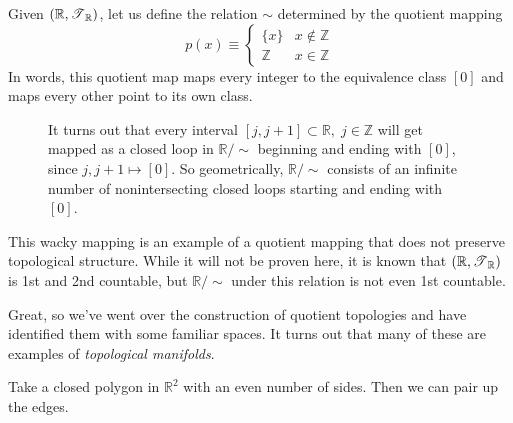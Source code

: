   \begin{example}
    Given $(\mathbb{R}, \operatorname{\mathscr{T}}_{\mathbb{R}})$, let us define the relation $\sim$ determined by the quotient mapping 
    \begin{equation}
      p(x) \equiv \begin{cases} \{x\} & x \not\in \mathbb{Z} \\ \mathbb{Z} & x \in \mathbb{Z} \end{cases}
    \end{equation}
    In words, this quotient map maps every integer to the equivalence class $[0]$ and maps every other point to its own class. 

    \begin{figure}[H]
      \centering 
      \caption{It turns out that every interval $[j, j+1] \subset \mathbb{R}, \; j \in \mathbb{Z}$ will get mapped as a closed loop in $\mathbb{R} / \sim$ beginning and ending with $[0]$, since $j, j+1 \mapsto [0]$. So geometrically, $\mathbb{R} / \sim$ consists of an infinite number of nonintersecting closed loops starting and ending with $[0]$. }
      \label{fig:integer}
    \end{figure}

    This wacky mapping is an example of a quotient mapping that does not preserve topological structure. While it will not be proven here, it is known that $(\mathbb{R}, \operatorname{\mathscr{T}}_{\mathbb{R}})$ is 1st and 2nd countable, but $\mathbb{R} / \sim$ under this relation is not even 1st countable. 
  \end{example} 

  Great, so we've went over the construction of quotient topologies and have identified them with some familiar spaces. It turns out that many of these are examples of \textit{topological manifolds}. 

  \begin{definition}
    Take a closed polygon in $\mathbb{R}^2$ with an even number of sides. Then we can pair up the edges. 
  \end{definition}

